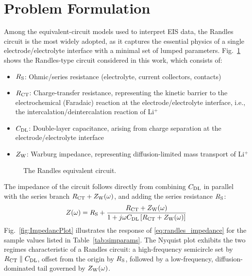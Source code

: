 \documentclass[conference]{IEEEtran}
\begin{document}
	\section{Problem Formulation}
	\label{sec:randles}

Among the equivalent-circuit models used to interpret EIS data, the Randles circuit is the most widely adopted, as it captures the essential physics of a single electrode/electrolyte interface with a minimal set of lumped parameters. Fig.~\ref{fig:randles_circuit} shows the Randles-type circuit considered in this work, which consists of:
	\begin{itemize}
		\item $R_{\rm S}$: Ohmic/series resistance (electrolyte, current collectors, contacts)
		\item $R_{\rm CT}$: Charge-transfer resistance, representing the kinetic barrier to the electrochemical (Faradaic) reaction at the electrode/electrolyte interface, i.e., the intercalation/deintercalation reaction of Li$^+$
		\item $C_{\rm DL}$: Double-layer capacitance, arising from charge separation at the electrode/electrolyte interface
		\item $Z_{\rm W}$: Warburg impedance, representing diffusion-limited mass transport of Li$^+$
	\end{itemize}

	\begin{figure}[htbp]
		\centering
		\caption{The Randles equivalent circuit.}
		\label{fig:randles_circuit}
	\end{figure}

	The impedance of the circuit follows directly from combining $C_{\rm DL}$ in parallel with the series branch $R_{\rm CT} + Z_{\rm W}(\omega)$, and adding the series resistance $R_{\rm S}$:
	\begin{equation}
		Z(\omega) = R_{\rm S} + \frac{R_{\rm CT} + Z_{\rm W}(\omega)}{1 + j\omega C_{\rm DL}\left[R_{\rm CT} + Z_{\rm W}(\omega)\right]}
		\label{eq:randles_impedance}
	\end{equation}
	Fig.~\ref{fig:ImpedancPlot} illustrates the response of \eqref{eq:randles_impedance} for the sample values listed in Table~\ref{tab:simparams}. The Nyquist plot exhibits the two regimes characteristic of a Randles circuit: a high-frequency semicircle set by $R_{\rm CT} \parallel C_{\rm DL}$, offset from the origin by $R_{\rm S}$, followed by a low-frequency, diffusion-dominated tail governed by $Z_{\rm W}(\omega)$.
\end{document}
